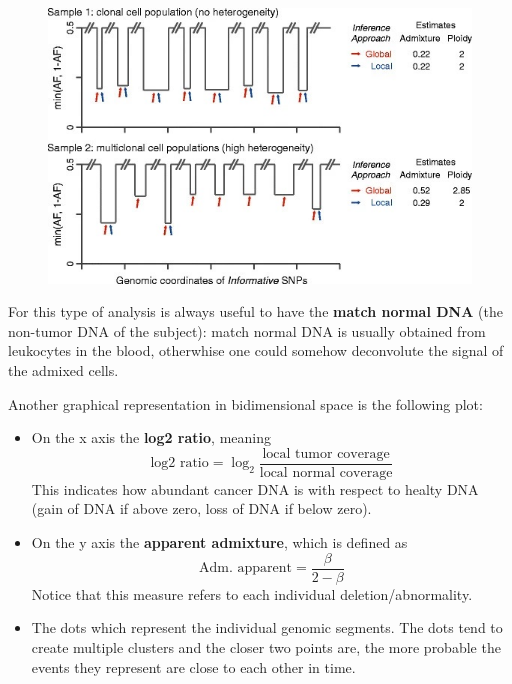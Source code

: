   \begin{figure}[H]
  \includegraphics{image_03.jpg}
  \end{figure}
  
  For this type of analysis is always useful to have the \textbf{match normal DNA} (the non-tumor DNA of the subject): match normal DNA is usually obtained from leukocytes in the blood, otherwhise one could somehow deconvolute the signal of the admixed cells. 

  Another graphical representation in bidimensional space is the following plot:
  \begin{itemize}
    \item On the x axis the \textbf{log2 ratio}, meaning 
      $$
      \text{log2 ratio} = \log_2\frac{\text{local tumor coverage}}{\text{local normal coverage}}
      $$ 
      This indicates how abundant cancer DNA is with respect to healty DNA (gain of DNA if above zero, loss of DNA if below zero).
    \item On the y axis the \textbf{apparent admixture}, which is defined as
      $$
      \text{Adm. apparent} = \frac{\beta}{2 - \beta}
      $$
      Notice that this measure refers to each individual deletion/abnormality.
    \item The dots which represent the individual genomic segments. The dots tend to create multiple clusters and the closer two points are, the more probable the events they represent are close to each other in time.
  \end{itemize}
  
